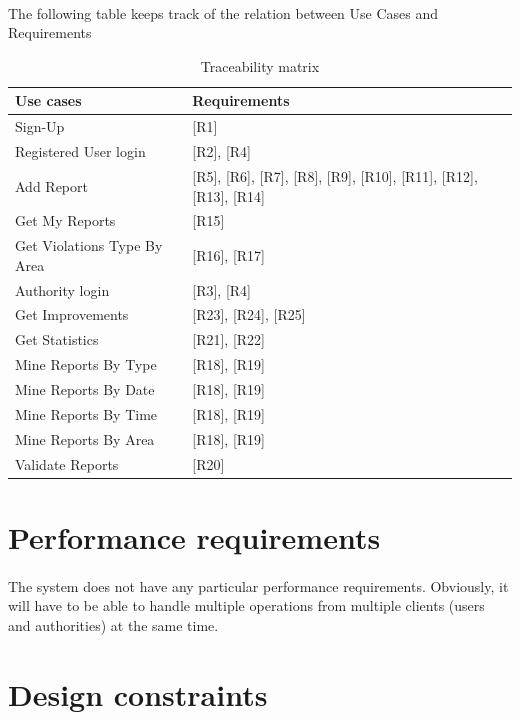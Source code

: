 				\paragraph{}
					The following table keeps track of the relation between Use Cases and Requirements
				\begin{table}[!h]
					\centering
					\begin{tabular}{lL{0.55\textwidth}}
						\toprule
							\textbf{Use cases} & \textbf{Requirements} \\
						\midrule
							Sign-Up & {[R1]} \\
							Registered User login & {[R2]}, {[R4]} \\
							Add Report & {[R5]}, {[R6]}, {[R7]}, {[R8]}, {[R9]}, {[R10]}, {[R11]}, {[R12]}, {[R13]}, {[R14]} \\
							Get My Reports & {[R15]} \\
							Get Violations Type By Area & {[R16]}, {[R17]} \\
							Authority login & {[R3]}, {[R4]} \\
							Get Improvements & {[R23]}, {[R24]}, {[R25]} \\
							Get Statistics & {[R21]}, {[R22]} \\
							Mine Reports By Type & {[R18]}, {[R19]} \\
							Mine Reports By Date & {[R18]}, {[R19]} \\
							Mine Reports By Time & {[R18]}, {[R19]} \\
							Mine Reports By Area & {[R18]}, {[R19]} \\
							Validate Reports & {[R20]} \\
						\bottomrule
					\end{tabular}
					\caption{Traceability matrix}
				\end{table}
		\section{Performance requirements}
			\paragraph{}
				The system does not have any particular performance requirements. Obviously, it will have to be able to handle multiple operations from multiple clients (users and authorities) at the same time.
		\section{Design constraints}
